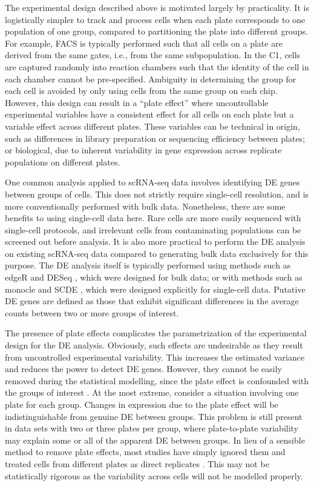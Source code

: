 \documentclass[oupdraft]{bio}
\begin{document}
The experimental design described above is motivated largely by practicality.
It is logistically simpler to track and process cells when each plate corresponds to one population of one group, compared to partitioning the plate into different groups.
For example, FACS is typically performed such that all cells on a plate are derived from the same gates, i.e., from the same subpopulation.
In the C1, cells are captured randomly into reaction chambers such that the identity of the cell in each chamber cannot be pre-specified.
Ambiguity in determining the group for each cell is avoided by only using cells from the same group on each chip.
However, this design can result in a ``plate effect'' where uncontrollable experimental variables have a consistent effect for all cells on each plate but a variable effect across different plates. 
These variables can be technical in origin, such as differences in library preparation or sequencing efficiency between plates; 
    or biological, due to inherent variability in gene expression across replicate populations on different plates.

One common analysis applied to scRNA-seq data involves identifying DE genes between groups of cells.
This does not strictly require single-cell resolution, and is more conventionally performed with bulk data.
Nonetheless, there are some benefits to using single-cell data here.
Rare cells are more easily sequenced with single-cell protocols, and irrelevant cells from contaminating populations can be screened out before analysis.
It is also more practical to perform the DE analysis on existing scRNA-seq data compared to generating bulk data exclusively for this purpose.
The DE analysis itself is typically performed using methods such as edgeR \citep{robinson2010edgeR} and DESeq \citep{anders2010differential}, which were designed for bulk data;
    or with methods such as monocle \citep{trapnell2014dynamics} and SCDE \citep{kharchenko2014bayesian}, which were designed explicitly for single-cell data.
Putative DE genes are defined as those that exhibit significant differences in the average counts between two or more groups of interest.

The presence of plate effects complicates the parametrization of the experimental design for the DE analysis.
Obviously, such effects are undesirable as they result from uncontrolled experimental variability.
This increases the estimated variance and reduces the power to detect DE genes.
However, they cannot be easily removed during the statistical modelling, since the plate effect is confounded with the groups of interest \citep{hicks2015widespread}.
At the most extreme, consider a situation involving one plate for each group.
Changes in expression due to the plate effect will be indistinguishable from genuine DE between groups.
This problem is still present in data sets with two or three plates per group, where plate-to-plate variability may explain some or all of the apparent DE between groups.
In lieu of a sensible method to remove plate effects, most studies have simply ignored them and treated cells from different plates as direct replicates \citep{kolod2015single,trapnell2014dynamics,avraham2015pathogen}.
This may not be statistically rigorous as the variability across cells will not be modelled properly.
\end{document}

